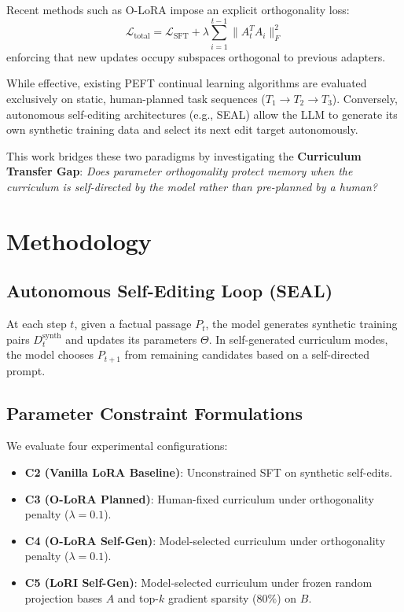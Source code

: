 \documentclass[10pt,journal,compsoc]{IEEEtran}
\begin{document}
Recent methods such as O-LoRA impose an explicit orthogonality loss:
\begin{equation}
\mathcal{L}_{\mathrm{total}} = \mathcal{L}_{\mathrm{SFT}} + \lambda \sum_{i=1}^{t-1} \|A_t^T A_i\|_F^2
\end{equation}
enforcing that new updates occupy subspaces orthogonal to previous adapters.

While effective, existing PEFT continual learning algorithms are evaluated exclusively on static, human-planned task sequences ($T_1 \rightarrow T_2 \rightarrow T_3$). Conversely, autonomous self-editing architectures (e.g., SEAL) allow the LLM to generate its own synthetic training data and select its next edit target autonomously. 

This work bridges these two paradigms by investigating the \textbf{Curriculum Transfer Gap}: \textit{Does parameter orthogonality protect memory when the curriculum is self-directed by the model rather than pre-planned by a human?}

\section{Methodology}

\subsection{Autonomous Self-Editing Loop (SEAL)}
At each step $t$, given a factual passage $P_t$, the model generates synthetic training pairs $D_t^{\mathrm{synth}}$ and updates its parameters $\Theta$. In self-generated curriculum modes, the model chooses $P_{t+1}$ from remaining candidates based on a self-directed prompt.

\subsection{Parameter Constraint Formulations}
We evaluate four experimental configurations:
\begin{itemize}
    \item \textbf{C2 (Vanilla LoRA Baseline)}: Unconstrained SFT on synthetic self-edits.
    \item \textbf{C3 (O-LoRA Planned)}: Human-fixed curriculum under orthogonality penalty ($\lambda = 0.1$).
    \item \textbf{C4 (O-LoRA Self-Gen)}: Model-selected curriculum under orthogonality penalty ($\lambda = 0.1$).
    \item \textbf{C5 (LoRI Self-Gen)}: Model-selected curriculum under frozen random projection bases $A$ and top-$k$ gradient sparsity ($80\%$) on $B$.
\end{itemize}
\end{document}
